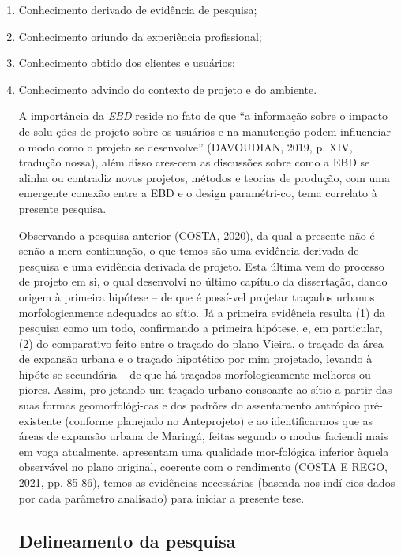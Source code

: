 \documentclass[twoside, 12pt]{book}
\begin{document}
        \begin{enumerate}[label=\alph*)]
            \item Conhecimento derivado de evidência de pesquisa;
            \item Conhecimento oriundo da experiência profissional; 
            \item Conhecimento obtido dos clientes e usuários;
            \item Conhecimento advindo do contexto de projeto e do ambiente.

        A importância da \textit{EBD} reside no fato de que “a informação sobre o impacto de solu-ções de projeto sobre os usuários e na manutenção podem influenciar o modo como o projeto se desenvolve” (DAVOUDIAN, 2019, p. XIV, tradução nossa), além disso cres-cem as discussões sobre como a EBD se alinha ou contradiz novos projetos, métodos e teorias de produção, com uma emergente conexão entre a EBD e o design paramétri-co, tema correlato à presente pesquisa.

        Observando a pesquisa anterior (COSTA, 2020), da qual a presente não é senão a mera continuação, o que temos são uma evidência derivada de pesquisa  e uma evidência derivada de projeto.  Esta última vem do processo de projeto em si, o qual desenvolvi no último capítulo da dissertação, dando origem à primeira hipótese – de que é possí-vel projetar traçados urbanos morfologicamente adequados ao sítio. Já a primeira evidência resulta (1) da pesquisa como um todo, confirmando a primeira hipótese, e, em particular, (2) do comparativo feito entre o traçado do plano Vieira, o traçado da área de expansão urbana e o traçado hipotético por mim projetado, levando à hipóte-se secundária – de que há traçados morfologicamente melhores ou piores. Assim, pro-jetando um traçado urbano consoante ao sítio a partir das suas formas geomorfológi-cas e dos padrões do assentamento antrópico pré-existente (conforme planejado no Anteprojeto) e ao identificarmos que as áreas de expansão urbana de Maringá, feitas segundo o modus faciendi mais em voga atualmente, apresentam uma qualidade mor-fológica inferior àquela observável no plano original, coerente com o rendimento (COSTA E REGO, 2021, pp. 85-86), temos as evidências necessárias (baseada nos indí-cios dados por cada parâmetro analisado) para iniciar a presente tese. 

    \subsection{Delineamento da pesquisa}


\end{enumerate}
\end{document}
